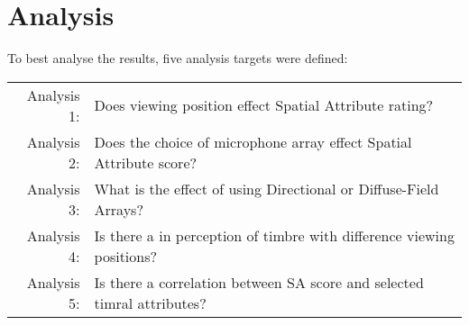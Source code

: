 
\section{Analysis}
	To best analyse the results, five analysis targets were defined:

	\begin{tabular}{r p{5.5cm}}
		Analysis 1: & Does viewing position effect Spatial Attribute rating? \\
		Analysis 2: & Does the choice of microphone array effect Spatial Attribute score? \\
		Analysis 3: & What is the effect of using Directional or Diffuse-Field Arrays? \\ 
		Analysis 4: & Is there a in perception of timbre with difference viewing positions? \\
		Analysis 5: & Is there a correlation between SA score and selected timral attributes?
	\end{tabular}

	

	
